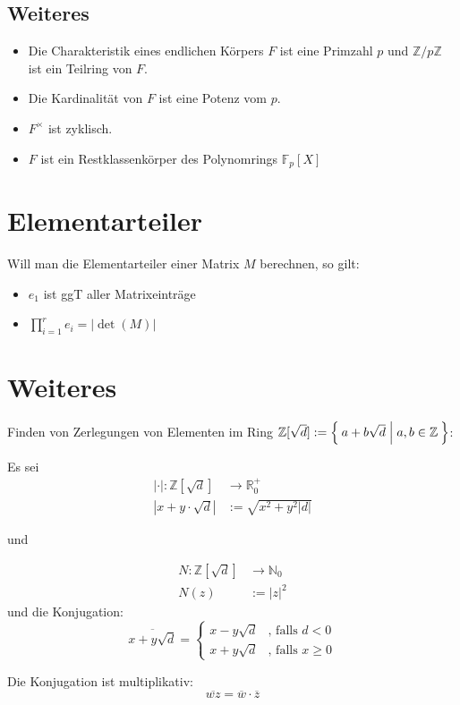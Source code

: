 \documentclass[a4paper,9pt]{scrartcl}
\begin{document}
\subsection*{Weiteres}
\begin{itemize}
	\item Die Charakteristik eines endlichen Körpers $F$ ist eine Primzahl 
          $p$ und $\mathbb{Z}/p\mathbb{Z}$ ist ein Teilring von $F$.
	\item Die Kardinalität von $F$ ist eine Potenz vom $p$.
	\item $F^\times$ ist zyklisch.
	\item $F$ ist ein Restklassenkörper des Polynomrings $\mathbb{F}_p [X]$
\end{itemize}

\section*{Elementarteiler}
Will man die Elementarteiler einer Matrix $M$ berechnen, so gilt:
\begin{itemize}
	\item $e_1$ ist ggT aller Matrixeinträge
	\item $\prod_{i=1}^r e_i = |\det(M)|$
\end{itemize}

\section*{Weiteres}
Finden von Zerlegungen von Elementen im Ring $\mathbb{Z}[\sqrt{d}] := \Set{a + b \sqrt{d} | a, b \in \mathbb{Z}}$:

Es sei
\begin{align*}
	|\cdot|:\mathbb{Z}[\sqrt{d}] &\rightarrow \mathbb{R}_0^+\\
	|x + y \cdot \sqrt{d}| &:= \sqrt{x^2 + y^2 |d|}
\end{align*}

und

\begin{align*}
	N:   \mathbb{Z}[\sqrt{d}] &\rightarrow \mathbb{N}_0\\
	N(z) &:= |z|^2
\end{align*}
und die Konjugation:
\[\overline{x+ y \sqrt{d}} = \begin{cases}x - y \sqrt{d} &\text{, falls } d < 0\\x + y \sqrt{d} &\text{, falls } x \geq 0\end{cases}\]

Die Konjugation ist multiplikativ:
\[\overline{wz} = \overline{w} \cdot \overline{z}\]
\end{document}
